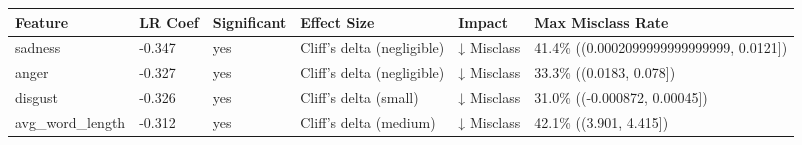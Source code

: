 \begin{tabular}{llllll}
\toprule
Feature & LR Coef & Significant & Effect Size & Impact & Max Misclass Rate \\
\midrule
sadness & -0.347 & yes & Cliff's delta (negligible) & ↓ Misclass & 41.4\% ((0.0002099999999999999, 0.0121]) \\
anger & -0.327 & yes & Cliff's delta (negligible) & ↓ Misclass & 33.3\% ((0.0183, 0.078]) \\
disgust & -0.326 & yes & Cliff's delta (small) & ↓ Misclass & 31.0\% ((-0.000872, 0.00045]) \\
avg\_word\_length & -0.312 & yes & Cliff's delta (medium) & ↓ Misclass & 42.1\% ((3.901, 4.415]) \\
\bottomrule
\end{tabular}
